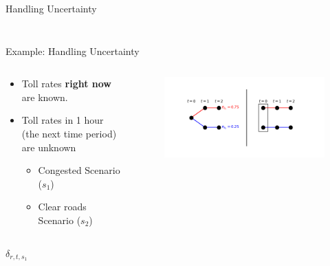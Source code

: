 \documentclass[10pt, aspectratio=169]{beamer}
\begin{document}
\begin{frame}{Handling Uncertainty}
\begin{columns}
\begin{column}{0.5\textwidth}
\begin{figure}
            \end{figure}
        \end{column}
    \end{columns}
\end{frame}

\begin{frame}{Example: Handling Uncertainty}
    \begin{columns}
        \begin{column}{0.5\textwidth}
            \begin{itemize}
                \item Toll rates \textbf{right now} are known.
                \item Toll rates in 1 hour (the next time period) are unknown
                \begin{itemize}
                    \item Congested Scenario ($s_1$)
                    \item Clear roads Scenario ($s_2$)
                \end{itemize}
            \end{itemize}
        \end{column}
        \begin{column}{0.5\textwidth}
            \begin{figure}
                \includegraphics[width=\linewidth]{RoutePlanningProblemWithScenarios.png}
            \end{figure}
        \end{column}
    \end{columns}
    \vspace{-0.7cm}
    \begin{columns}
        \begin{column}{0.4\textwidth}
            \begin{center}
                $\delta_{r,t,s_1}$


\end{center}
\end{column}
\end{columns}
\end{frame}
\end{document}
